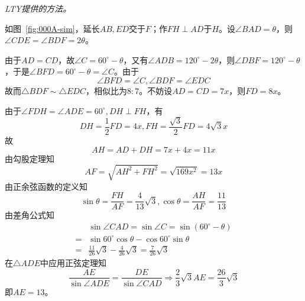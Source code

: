 \emph{LTY提供的方法。}

如图~\ref{fig:000A-sim}，延长$AB, ED$交于$F$；作$FH \perp AD$于$H$。设$\angle BAD = \theta$，则$\angle CDE = \angle BDF = 2\theta$。

由于$AD = CD$，故$\angle C = 60^\circ - \theta$，又有$\angle ADB = 120^\circ - 2\theta$，则$\angle DBF = 120^\circ - \theta$，于是$\angle BFD = 60^\circ - \theta = \angle C$。由于
\[ \angle BFD = \angle C, \angle BDF = \angle EDC \]
故而$\triangle BDF \sim \triangle EDC$，相似比为$8:7$。不妨设$AD = CD = 7x$，则$FD = 8x$。

由于$\angle FDH = \angle ADE = 60^\circ, DH \perp FH$，有
\[ DH = \frac12FD = 4x, FH = \frac{\sqrt3}2FD = 4\sqrt3x \]
故
\[ AH = AD + DH = 7x + 4x = 11x \]
由勾股定理知
\[ AF = \sqrt{AH^2 + FH^2} = \sqrt{169x^2} = 13x \]
由正余弦函数的定义知
\[ \sin\theta = \frac{FH}{AF} = \frac4{13}\sqrt3, \cos\theta = \frac{AH}{AF} = \frac{11}{13} \]
由差角公式知
\begin{align*}
  & \sin\angle CAD = \sin\angle C = \sin(60^\circ - \theta) \\
  ={}& \sin60^\circ\cos\theta - \cos60^\circ\sin\theta \\
  ={}& \frac{11}{26}\sqrt3 - \frac4{26}\sqrt3 = \frac7{26}\sqrt3
\end{align*}
在$\triangle ADE$中应用正弦定理知
\[ \frac{AE}{\sin\angle ADE} = \frac{DE}{\sin\angle CAD} \Rightarrow \frac23\sqrt3AE = \frac{26}3\sqrt3 \]
即$AE = 13$。
